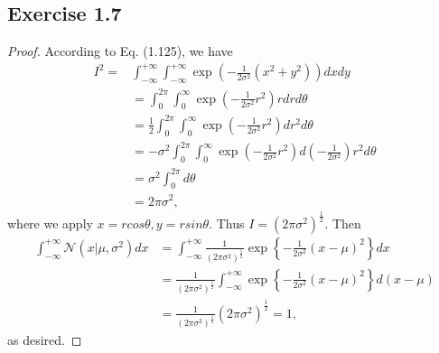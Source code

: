 \documentclass[11pt]{article}
\theoremstyle{definition}
\begin{document}
\subsection{Exercise 1.7}
\begin{proof}
According to Eq. (1.125), we have
\begin{align*}
I^2 =& \int^{+\infty}_{-\infty}\int^{+\infty}_{-\infty}\exp\left(-\frac{1}{2\sigma^2}(x^2+y^2)\right)dxdy\\
&= \int^{2\pi}_{0}\int^{\infty}_{0}\exp\left(-\frac{1}{2\sigma^2}r^2\right)rdrd\theta\\
&= \frac{1}{2}\int^{2\pi}_{0}\int^{\infty}_{0}\exp\left(-\frac{1}{2\sigma^2}r^2\right)dr^2d\theta\\
&= -\sigma^2\int^{2\pi}_{0}\int^{\infty}_{0}\exp\left(-\frac{1}{2\sigma^2}r^2\right)d\left(-\frac{1}{2\sigma^2}\right)r^2d\theta\\
&=\sigma^2\int^{2\pi}_{0}d\theta\\
&= 2\pi\sigma^2,
\end{align*}
where we apply $x = rcos\theta, y = rsin\theta$. Thus $I = (2\pi\sigma^2)^{\frac{1}{2}}$. Then
\begin{align*}
\int^{+\infty}_{-\infty}\mathcal{N}\left(x|\mu,\sigma^2\right)dx &= \int^{+\infty}_{-\infty}\frac{1}{(2\pi\sigma^2)^{\frac{1}{2}}}\exp\left\{-\frac{1}{2\sigma^2}\left(x-\mu\right)^2\right\}dx\\
&= \frac{1}{(2\pi\sigma^2)^{\frac{1}{2}}}\int^{+\infty}_{-\infty}\exp\left\{-\frac{1}{2\sigma^2}\left(x-\mu\right)^2\right\}d(x-\mu)\\
& = \frac{1}{(2\pi\sigma^2)^{\frac{1}{2}}}(2\pi\sigma^2)^{\frac{1}{2}} = 1,
\end{align*}
as desired.
\end{proof}
\end{document}
